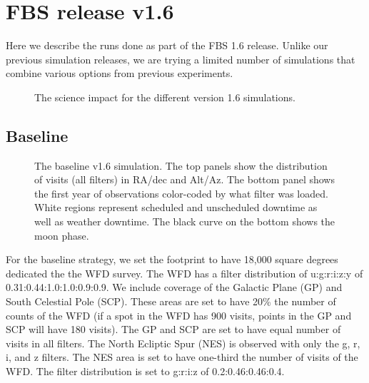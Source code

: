 
\section{FBS release v1.6}

Here we describe the runs done as part of the FBS 1.6 release.  Unlike our previous simulation releases, we are trying a limited number of simulations that combine various options from previous experiments.


\begin{figure}
\caption{The science impact for the different version 1.6 simulations.}\label{fig:v16radar}
\end{figure}

\subsection{Baseline}

\begin{figure}
\caption{The baseline v1.6 simulation. The top panels show the distribution of visits (all filters) in RA/dec and Alt/Az. The bottom panel shows the first year of observations color-coded by what filter was loaded. White regions represent scheduled and unscheduled downtime as well as weather downtime. The black curve on the bottom shows the moon phase.}\label{fig:baseline1.6}
\end{figure}


For the baseline strategy, we set the footprint to have 18,000 square degrees dedicated the the WFD survey. The WFD has a filter distribution of u:g:r:i:z:y of 0.31:0.44:1.0:1.0:0.9:0.9. 
We include coverage of the Galactic Plane (GP) and South Celestial Pole (SCP). These areas are set to have 20\% the number of counts of the WFD (if a spot in the WFD has 900 visits, points in the GP and SCP will have 180 visits). The GP and SCP are set to have equal number of visits in all filters.  The North Ecliptic Spur (NES) is observed with only the g, r, i, and z filters. The NES area is set to have one-third the number of visits of the WFD.  The filter distribution is set to g:r:i:z of 0.2:0.46:0.46:0.4. 

